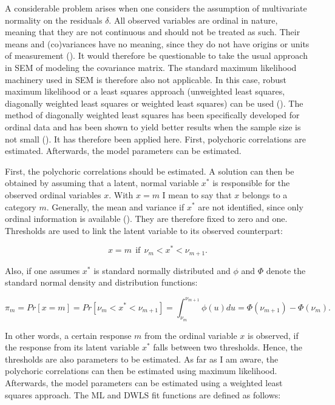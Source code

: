 \documentclass[11pt]{article}
\begin{document}
A considerable problem arises when one considers the assumption of multivariate
normality on the residuals $\delta$. All observed variables are ordinal in nature,
meaning that they are not continuous and should not be treated as such. Their
means and (co)variances have no meaning, since they do not have origins or units
of measurement (\cite{joreskog1994}). It would therefore be questionable to
take the usual approach in SEM of modeling the covariance matrix. The standard
maximum likelihood machinery used in SEM is therefore also not applicable. In this
case, robust maximum likelihood or a least squares approach (unweighted least
squares, diagonally weighted least squares or weighted least squares) can be used
(\cite{yangwallentin2010}). The method of diagonally weighted least squares has
been specifically developed for ordinal data and has been shown to yield better
results when the sample size is not small (\cite{li2016}). It has therefore been
applied here. First, polychoric correlations are estimated. Afterwards, the model
parameters can be estimated. 

First, the polychoric correlations should be estimated. A solution can then be
obtained by assuming that a latent, normal variable $x^*$ is responsible for the
observed ordinal variables $x$. With $x=m$ I mean to say that $x$ belongs to a
category $m$. Generally, the mean and variance if $x^*$ are not identified, since
only ordinal information is available (\cite{simsek2012}). They are therefore
fixed to zero and one. Thresholds are used to link the latent variable to its
observed counterpart:

\begin{equation}
  x = m \:\: \text{if} \:\: \nu_m < x^* < \nu_{m+1} .
\end{equation}

Also, if one assumes $x^*$ is standard normally distributed and $\phi$ and $\Phi$
denote the standard normal density and distribution functions:

\begin{equation}
  \pi_m = Pr[x=m] = Pr[\nu_m < x^* < \nu_{m+1}] = \int^{\nu_{m+1}}_{\nu_m} \phi(u)du = \Phi(\nu_{m+1}) - \Phi(\nu_m) .
\end{equation}

In other words, a certain response $m$ from the ordinal variable $x$ is observed,
if the response from its latent variable $x^*$ falls between two thresholds.
Hence, the thresholds are also parameters to be estimated. As far as I am aware,
the polychoric correlations can then be estimated using maximum likelihood.
Afterwards, the model parameters can be estimated using a weighted least squares
approach. The ML and DWLS fit functions are defined as follows:
\end{document}
